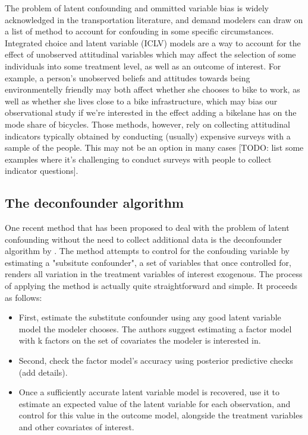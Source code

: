 The problem of latent confounding and ommitted variable bias is widely 
acknowledged in the transportation literature, and demand modelers can draw on 
a list of method to account for confouding in some specific circumstances. 
Integrated choice and latent variable (ICLV) models are a way to account for 
the effect of unobserved attitudinal variables which may affect the selection 
of some individuals into some treatment level, as well as an outcome of 
interest. For example, a person's unobserved beliefs and attitudes towards 
being environmentelly friendly may both affect whether she chooses to bike to 
work, as well as whether she lives close to a bike infrastructure, which may 
bias our observational study if we're interested in the effect adding a 
bikelane has on the mode share of bicycles. Those methods, however, rely on 
collecting attitudinal indicators typically obtained by conducting (usually) 
expensive surveys with a sample of the people. This may not be an option in 
many cases [TODO: list some examples where it's challenging to conduct surveys 
with people to collect indicator questions]. 


\subsection{The deconfounder algorithm}
\label{sec:deconfounder-algo}



One recent method that has been proposed to deal with the problem of latent 
confounding without the need to collect additional data is the deconfounder 
algorithm by \citet{wang_2019_blessings}. The method attempts to control for the 
confouding variable by estimating a "subsitute confounder", a set of variables 
that once controlled for, renders all variation in the treatment variables of 
interest exogenous. The process of applying the method is actually quite 
straightforward and simple. It proceeds as follows:
\begin{itemize}
	\item First, estimate the substitute confounder using any good latent variable 
	model the modeler chooses. The authors suggest estimating a factor model 
	with k factors on the set of covariates the modeler is interested in. 
	\item Second, check the factor model's accuracy using posterior predictive 
	checks (add details). 
	\item Once a sufficiently accurate latent variable model is recovered, use it 
	to estimate an expected value of the latent variable for each observation, 
	and control for this value in the outcome model, alongside the treatment 
	variables and other covariates of interest. 
\end{itemize}



